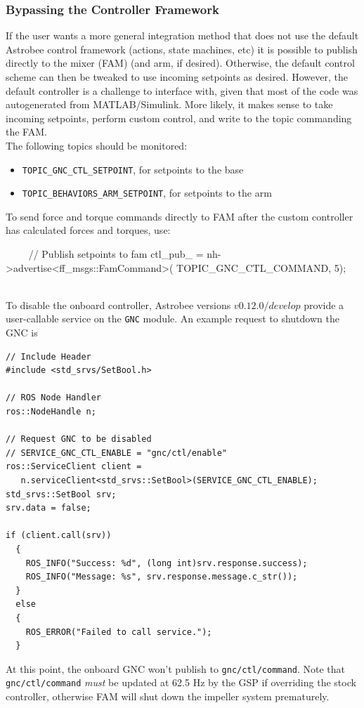 \documentclass{article}
\begin{document}
\subsubsection{Bypassing the Controller Framework}

If the user wants a more general integration method that does not use the default Astrobee control framework (actions, state machines, etc) it is possible to publish directly to the mixer (FAM) (and arm, if desired). Otherwise, the default control scheme can then be tweaked to use incoming setpoints as desired. However, the default controller is a challenge to interface with, given that most of the code was autogenerated from MATLAB/Simulink. More likely, it makes sense to take incoming setpoints, perform custom control, and write to the topic commanding the FAM.\\

The following topics should be monitored:
\begin{itemize}
	\item \texttt{TOPIC\_GNC\_CTL\_SETPOINT}, for setpoints to the base
	\item \texttt{TOPIC\_BEHAVIORS\_ARM\_SETPOINT}, for setpoints to the arm
\end{itemize}

\indent To send force and torque commands directly to FAM after the custom controller has calculated forces and torques, use:
\begin{markdown}
~~~~
//  Publish setpoints to fam
ctl_pub_ = nh->advertise<ff_msgs::FamCommand>(
TOPIC_GNC_CTL_COMMAND, 5);
~~~~
\end{markdown}

To disable the onboard controller, Astrobee versions $v0.12.0/develop$ provide a user-callable service 
on the \texttt{GNC} module. An example request to shutdown the GNC is
\begin{lstlisting}
// Include Header 
#include <std_srvs/SetBool.h>

// ROS Node Handler
ros::NodeHandle n;

// Request GNC to be disabled
// SERVICE_GNC_CTL_ENABLE = "gnc/ctl/enable" 
ros::ServiceClient client = 
   n.serviceClient<std_srvs::SetBool>(SERVICE_GNC_CTL_ENABLE);
std_srvs::SetBool srv;
srv.data = false;

if (client.call(srv))
  {
    ROS_INFO("Success: %d", (long int)srv.response.success);
    ROS_INFO("Message: %s", srv.response.message.c_str());
  }
  else
  {
    ROS_ERROR("Failed to call service.");
  }
\end{lstlisting}
At this point, the onboard GNC won't publish to \texttt{gnc/ctl/command}. Note that \texttt{gnc/ctl/command} \textit{must} be updated at 62.5 Hz by the GSP if overriding the stock controller, otherwise FAM will shut down the impeller system prematurely. 
\end{document}
